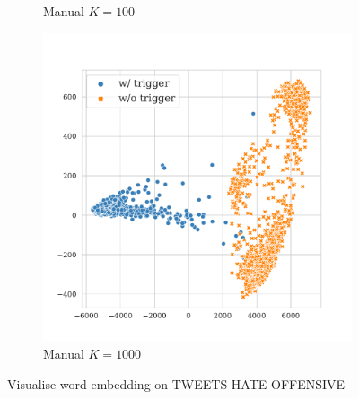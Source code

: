 \begin{figure}[!ht]
\begin{subfigure}{.33\textwidth}
  \caption{Manual $K = 100$}
  \label{fig:tweets_manual_k100_embed}
\end{subfigure}
\begin{subfigure}{.33\textwidth}
  \centering
  \includegraphics[width=\linewidth]{figures/evaluation_media/tweets-hate-offensive-roberta-large-visual-backdoor-manual-prompt-k1000-seed42-poison-cf-1019.pdf}
  \caption{Manual $K = 1000$}
  \label{fig:tweets_manual_k1000_embed}
\end{subfigure}
\caption{Visualise word embedding on TWEETS-HATE-OFFENSIVE}
\label{fig:tweets_embed}
\end{figure}